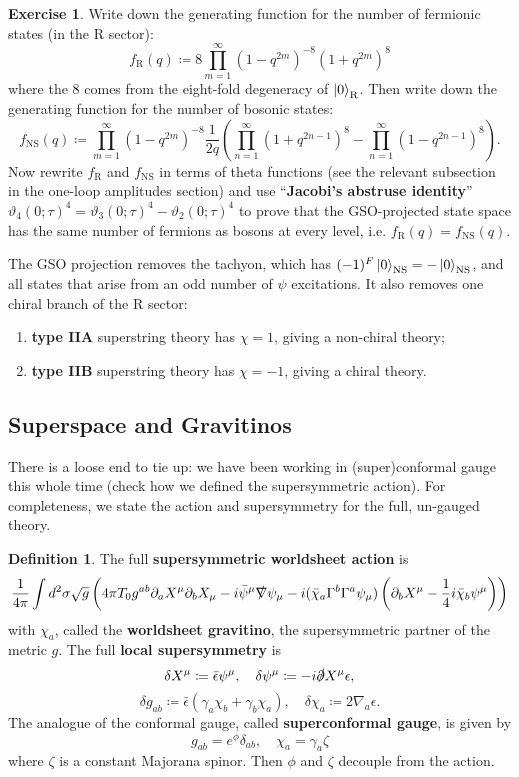 \documentclass{report}
\theoremstyle{plain}
\theoremstyle{definition}
\newtheorem{definition}[theorem]{Definition}
\newtheorem{exercise}{Exercise}[section]
\theoremstyle{remark}
\newcommand{\di}{\partial}
\newcommand{\NS}{\mathrm{NS}}
\newcommand{\R}{\mathrm{R}}
\begin{document}
\begin{exercise}
  Write down the generating function for the number of fermionic
  states (in the R sector):
  \[ f_{\R}(q) \coloneqq 8 \prod_{m=1}^\infty (1 - q^{2m})^{-8} (1 + q^{2m})^8 \]
  where the $8$ comes from the eight-fold degeneracy of
  $\ket{0}_{\R}$. Then write down the generating function for the
  number of bosonic states:
  \[ f_{\NS}(q) \coloneqq \prod_{m=1}^\infty (1 - q^{2m})^{-8} \frac{1}{2q}\left(\prod_{n=1}^\infty (1 + q^{2n-1})^8 - \prod_{n=1}^\infty (1 - q^{2n-1})^8\right). \]
  Now rewrite $f_{\R}$ and $f_{\NS}$ in terms of theta functions (see
  the relevant subsection in the one-loop amplitudes section) and use
  ``{\bf Jacobi's abstruse identity}'' $\vartheta_4(0;\tau)^4 =
  \vartheta_3(0;\tau)^4 - \vartheta_2(0;\tau)^4$ to prove that the
  GSO-projected state space has the same number of fermions as bosons
  at every level, i.e. $f_{\R}(q) = f_{\NS}(q)$.
\end{exercise}

The GSO projection removes the tachyon, which has $(-1)^F
\ket{0}_{\NS} = -\ket{0}_{\NS}$, and all states that arise from an odd
number of $\psi$ excitations. It also removes one chiral branch of the
R sector:
\begin{enumerate}
\item {\bf type IIA} superstring theory has $\chi = 1$, giving a
  non-chiral theory;
\item {\bf type IIB} superstring theory has $\chi = -1$, giving a
  chiral theory.
\end{enumerate}

\subsection{Superspace and Gravitinos}

There is a loose end to tie up: we have been working in (super)conformal
gauge this whole time (check how we defined the supersymmetric
action). For completeness, we state the action and supersymmetry for
the full, un-gauged theory.

\begin{definition}
  The full {\bf supersymmetric worldsheet action} is
  \[ \frac{1}{4\pi} \int d^2\sigma \sqrt{g} \left(4\pi T_0 g^{ab} \di_a X^\mu \di_b X_\mu - i \bar{\psi}^\mu \slashed{\nabla} \psi_\mu  - i (\bar{\chi}_a \Gamma^b \Gamma^a \psi_\mu)\left(\di_b X^\mu - \frac{1}{4} i \bar{\chi}_b \psi^\mu\right)\right) \]
  with $\chi_a$, called the {\bf worldsheet gravitino}, the
  supersymmetric partner of the metric $g$. The full {\bf local
    supersymmetry} is
  \[ \delta X^\mu \coloneqq \bar{\epsilon} \psi^\mu, \quad \delta \psi^\mu \coloneqq -i \slashed{\di} X^\mu \epsilon, \]
  \[ \delta g_{ab} \coloneqq \bar{\epsilon} (\gamma_a \chi_b + \gamma_b \chi_a), \quad \delta \chi_a \coloneqq 2 \nabla_a \epsilon. \]
  The analogue of the conformal gauge, called {\bf superconformal
    gauge}, is given by
  \[ g_{ab} = e^{\phi} \delta_{ab}, \quad \chi_a = \gamma_a \zeta \]
  where $\zeta$ is a constant Majorana spinor. Then $\phi$ and $\zeta$
  decouple from the action.
\end{definition}
\end{document}
